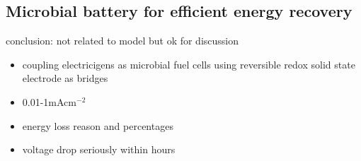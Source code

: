 \documentclass[a4paper,11pt]{article}
\begin{document}
    \subsection{Microbial battery for efficient energy recovery}
    conclusion\autocite{xie2013microbial}: not related to model but ok for discussion
    \begin{itemize}
        \item coupling electricigens as microbial fuel cells using reversible redox solid state electrode as bridges
        \item 0.01-1mAcm$^{-2}$
        \item energy loss reason and percentages
        \item voltage drop seriously within hours
    \end{itemize}
    
    \nocite{*}\printbibliography
\end{document}
